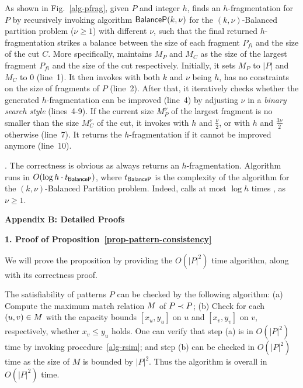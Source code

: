 As shown in Fig.~\ref{alg-pfrag}, given $P$ and integer $h$,
 finds an $h$-fragmentation for $P$ by recursively invoking algorithm ${\mathsf{BalanceP}}(k,\nu)$ for the {\sc $(k,\nu)$-Balanced partition} problem ($\nu\geq 1$) with different $\nu$,
such that the final returned $h$-fragmentation strikes a balance between the size of each fragment ${P}_{fi}$ and the size of the cut $C$.
More specifically,  maintains $M_P$ and $M_C$ as the size of the largest fragment ${P}_{fi}$ and the size of the cut respectively.
Initially, it sets $M_P$ to $|P|$ and $M_C$ to 0 (line~1).
It then invokes  with both $k$ and $\nu$ being $h$, \ie has no constraints on the size of fragments of $P$ (line~2).
After that, it iteratively checks whether the generated $h$-fragmentation can be improved (line~4) by adjusting $\nu$ in a {\em binary search style} (lines~4-9).
If the current size $M^\nu_P$ of the largest fragment is no smaller than the size $M^\nu_C$ of the cut,
it invokes  with $h$ and $\frac{\nu}{2}$, or with $h$ and $\frac{3\nu}{2}$ otherwise (line~7).
It returns the $h$-fragmentation if it cannot be improved anymore (line~10).

\vspace{-1.5ex}
.
The correctness is obvious as  always returns an $h$-fragmentation.
Algorithm~ runs in $O(\log h\cdot t_{{\mathsf{BalanceP}}})$, where $t_{{\mathsf{BalanceP}}}$ is the complexity of the algorithm for the {\sc $(k,\nu)$-Balanced Partition} problem. Indeed,  calls at most $\log h$ times , as $\nu\geq 1$.


\vspace{1ex}
\noindent
{\large \textbf{Appendix B: Detailed Proofs}}
\label{sec-apd-proofs}

\noindent
{\textbf{1. Proof of Proposition~\ref{prop-pattern-consistency}}}

We will prove the proposition by providing the $O(|P|^2)$ time algorithm, along with its correctness proof.

\vspace{-1.5ex}
The satisfiability of patterns $P$ can be checked by the following algorithm:
(a) Compute the maximum match relation $M$ of $P \prec P$;
(b) Check for each $(u, v)\in M$ with the capacity bounds $[x_u, y_u]$ on $u$ and $[x_v, y_v]$ on $v$, respectively, whether $x_v \leq y_u$ holds.
One can verify that step (a) is in $O(|P|^2)$ time by invoking procedure~\ref{alg-rsim}; and step (b) can be checked in $O(|P|^2)$ time as the size of $M$ is bounded by $|P|^2$. Thus the algorithm is overall in $O(|P|^2)$ time.

